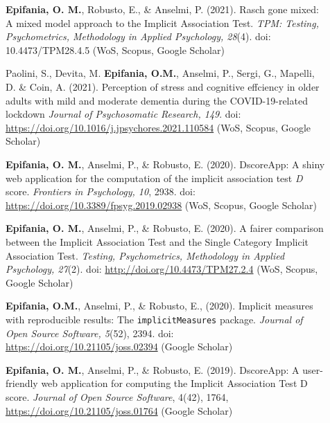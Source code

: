\documentclass[letterpaper,12pt]{article}
\begin{document}
\begin{description}
\item[] \textbf{Epifania, O. M.}, Robusto, E., \& Anselmi, P. (2021). Rasch gone mixed: A mixed model approach to the Implicit Association Test. \emph{TPM: Testing, Psychometrics, Methodology in Applied Psychology, 28}(4). doi: 10.4473/TPM28.4.5 (WoS, Scopus, Google Scholar)
\item[] Paolini, S., Devita, M. \textbf{Epifania, O.M.}, Anselmi, P., Sergi, G., Mapelli, D. \& Coin, A. (2021). Perception of stress and cognitive effciency in older adults with mild and moderate dementia during the COVID-19-related lockdown \emph{Journal of Psychosomatic Research, 149}. doi: \url{https://doi.org/10.1016/j.jpsychores.2021.110584} (WoS, Scopus, Google Scholar)
\item[] \textbf{Epifania, O. M.}, Anselmi, P., \& Robusto, E. (2020). DscoreApp: A shiny web application for the computation of the implicit association test \emph{D} score. \emph{Frontiers in Psychology, 10}, 2938. doi: \url{https://doi.org/10.3389/fpsyg.2019.02938}  (WoS, Scopus, Google Scholar)
\item[] \textbf{Epifania, O. M.}, Anselmi, P., \& Robusto, E. (2020). A fairer comparison between the Implicit Association Test and the Single Category Implicit Association Test. \emph{Testing, Psychometrics, Methodology in Applied Psychology, 27}(2). doi: \url{http://doi.org/10.4473/TPM27.2.4} (WoS, Scopus, Google Scholar)

	
\item[] \textbf{Epifania, O.M.}, Anselmi, P., \& Robusto, E., (2020). Implicit measures with reproducible results: The \texttt{implicitMeasures} package. \emph{Journal of Open Source Software, 5}(52), 2394. doi: \url{https://doi.org/10.21105/joss.02394} (Google Scholar)


\item[] \textbf{Epifania, O. M.}, Anselmi, P., \& Robusto, E. (2019). DscoreApp: A user-friendly web application for computing the Implicit Association Test D score. \emph{Journal of Open Source Software}, 4(42), 1764, \url{https://doi.org/10.21105/joss.01764} (Google Scholar)



\end{description}
\end{document}
